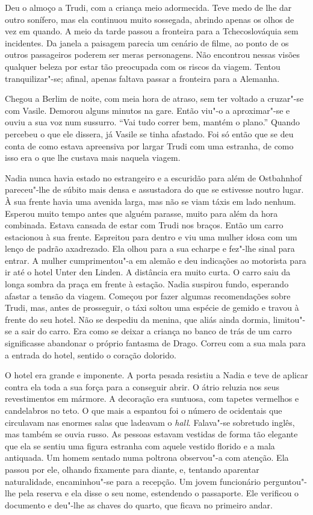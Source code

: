 Deu o almoço a Trudi, com a criança meio adormecida. Teve medo de lhe
dar outro sonífero, mas ela continuou muito sossegada, abrindo apenas os
olhos de vez em quando. A meio da tarde passou a fronteira para a Tchecoslováquia sem incidentes. Da janela a paisagem parecia um cenário de
filme, ao ponto de os outros passageiros poderem ser meras personagens.
Não encontrou nessas visões qualquer beleza por estar tão preocupada com
os riscos da viagem. Tentou tranquilizar"-se; afinal, apenas faltava
passar a fronteira para a Alemanha.

\bigskip

Chegou a Berlim de noite, com meia hora de atraso, sem ter voltado a
cruzar"-se com Vasile. Demorou alguns minutos na gare. Então viu"-o a
aproximar"-se e ouviu a sua voz num sussurro. ``Vai tudo correr bem,
mantém o plano.'' Quando percebeu o que ele dissera, já Vasile se tinha
afastado. Foi só então que se deu conta de como estava apreensiva
por largar Trudi com uma estranha, de como isso era o que lhe custava
mais naquela viagem.

Nadia nunca havia estado no estrangeiro e a escuridão para além de
Ostbahnhof pareceu"-lhe de súbito mais densa e assustadora do que se
estivesse noutro lugar. À sua frente havia uma avenida larga, mas não se
viam táxis em lado nenhum. Esperou muito tempo antes que alguém parasse,
muito para além da hora combinada. Estava cansada de estar com Trudi nos
braços. Então um carro estacionou à sua frente. Espreitou para dentro e
viu uma mulher idosa com um lenço de padrão axadrezado. Ela olhou para a
sua echarpe e fez"-lhe sinal para entrar. A mulher cumprimentou"-a em
alemão e deu indicações ao motorista para ir até o hotel Unter den
Linden. A distância era muito curta. O carro saiu da longa sombra da
praça em frente à estação. Nadia suspirou fundo, esperando afastar a
tensão da viagem. Começou por fazer algumas recomendações sobre Trudi,
mas, antes de prosseguir, o táxi soltou uma espécie de gemido e travou à
frente do seu hotel. Não se despediu da menina, que aliás ainda dormia,
limitou"-se a sair do carro. Era como se deixar a criança no banco de
trás de um carro significasse abandonar o próprio fantasma de Drago.
Correu com a sua mala para a entrada do hotel, sentido o coração dolorido.

O hotel era grande e imponente. A porta pesada resistiu
a Nadia e teve de aplicar contra ela toda a sua força para a conseguir
abrir. O átrio reluzia nos seus revestimentos em mármore. A decoração
era suntuosa, com tapetes vermelhos e candelabros no teto. O que mais
a espantou foi o número de ocidentais que circulavam nas enormes salas
que ladeavam o \emph{hall}. Falava"-se sobretudo inglês, mas também se
ouvia russo. As pessoas estavam vestidas de
forma tão elegante que ela se sentiu uma figura estranha com aquele
vestido florido e a mala antiquada. Um homem sentado numa poltrona
observou"-a com atenção. Ela passou por ele, olhando fixamente para
diante, e, tentando aparentar naturalidade, encaminhou"-se para a
recepção. Um jovem funcionário perguntou"-lhe pela reserva e ela disse o
seu nome, estendendo o passaporte. Ele verificou o documento e deu"-lhe
as chaves do quarto, que ficava no primeiro andar.

